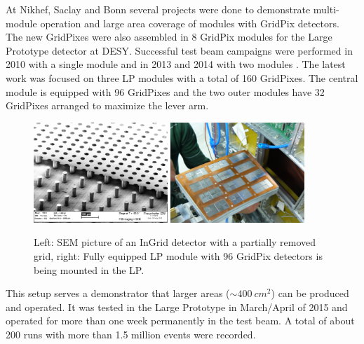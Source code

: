 At Nikhef, Saclay and Bonn several projects were done to demonstrate
multi-module operation and large area coverage of modules with GridPix
detectors. The new GridPixes were also assembled in 8
GridPix modules for the Large Prototype detector at DESY. Successful test beam
campaigns were performed in 2010 with a single module and in 2013 and 2014
with two modules
\cite{1748-0221-9-01-C01033}. The latest work was focused on three LP modules
with a total of 160 GridPixes. The central module is equipped with 96
GridPixes and the two outer modules have 32 GridPixes arranged to maximize the
lever arm.
\begin{figure}[!t]
  \centering
  \includegraphics[width=0.45\textwidth]{Tracker/TPC_Bonn/plots/TPC_pixels_GridPix.png}
  \includegraphics[width=0.45\textwidth]{Tracker/TPC_Bonn/plots/TPC_pixel_complete_module.png}
  \caption{Left: SEM picture of an InGrid detector with a partially removed
    grid, right: Fully equipped LP module with 96 GridPix detectors is being
    mounted in the LP.}
  \label{fig_TPC_pixels_1}
\end{figure}

This setup serves a demonstrator that larger areas ($\sim\SI{400}{cm^2}$) can be produced and operated. It was tested in the Large Prototype in
March/April of 2015 and operated for more than one week permanently in the
test beam. A total of about 200 runs with more than 1.5 million events were recorded.

